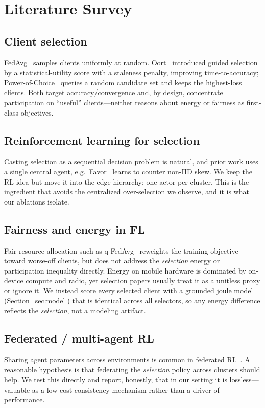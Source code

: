 \documentclass[conference]{IEEEtran}
\begin{document}
\section{Literature Survey}
\subsection{Client selection}
FedAvg~\cite{mcmahan2017} samples clients uniformly at random. Oort~\cite{oort}
introduced guided selection by a statistical-utility score with a staleness
penalty, improving time-to-accuracy; Power-of-Choice~\cite{poc} queries a random
candidate set and keeps the highest-loss clients. Both target
accuracy/convergence and, by design, concentrate participation on ``useful''
clients---neither reasons about energy or fairness as first-class objectives.

\subsection{Reinforcement learning for selection}
Casting selection as a sequential decision problem is natural, and prior work uses
a single central agent, e.g.\ Favor~\cite{rlselect} learns to counter non-IID
skew. We keep the RL idea but move it into the edge hierarchy: one actor per
cluster. This is the ingredient that avoids the centralized over-selection we
observe, and it is what our ablations isolate.

\subsection{Fairness and energy in FL}
Fair resource allocation such as q-FedAvg~\cite{qffl} reweights the training
objective toward worse-off clients, but does not address the \emph{selection}
energy or participation inequality directly. Energy on mobile hardware is
dominated by on-device compute and radio, yet selection papers usually treat it
as a unitless proxy or ignore it. We instead score every selected client with a
grounded joule model (Section~\ref{sec:model}) that is identical across all
selectors, so any energy difference reflects the \emph{selection}, not a modeling
artifact.

\subsection{Federated / multi-agent RL}
Sharing agent parameters across environments is common in federated
RL~\cite{fedrl}. A reasonable hypothesis is that federating the \emph{selection}
policy across clusters should help. We test this directly and report, honestly,
that in our setting it is lossless---valuable as a low-cost consistency mechanism
rather than a driver of performance.
\end{document}
